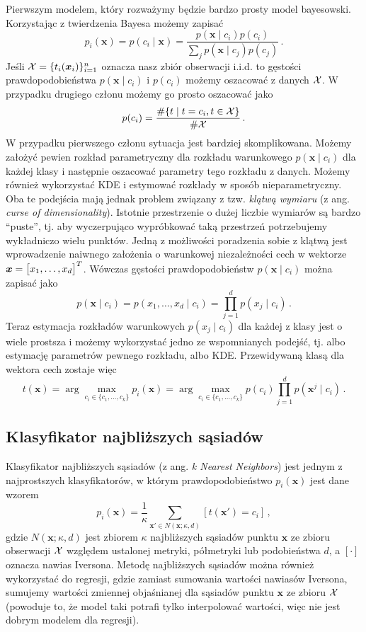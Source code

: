 \documentclass{myclass}
\numberwithin{equation}{subsection}
\begin{document}
Pierwszym modelem, który rozważymy będzie bardzo prosty model bayesowski. Korzystając z twierdzenia
Bayesa możemy zapisać
\[
p_i(\bm{x}) = p(c_i \mid \bm{x}) = \frac{ p(\bm{x} \mid c_i) p(c_i) }{ \sum_j p(\bm{x} \mid c_j) p(c_j) }\,.
\]
Jeśli \(\mathcal{X} = \{t_i(\bm{x}_i)\}_{i=1}^n\) oznacza nasz zbiór obserwacji i.i.d. to gęstości
prawdopodobieństwa \(p(\bm{x} \mid c_i)\) i \(p(c_i)\) możemy oszacować z danych \(\mathcal{X}\). W
przypadku drugiego członu możemy go prosto oszacować jako
\[
p(c_i) = \frac{\#\{t \mid t = c_i, t \in \mathcal{X}\}}{\#\mathcal{X}}\,.
\]
W przypadku pierwszego członu sytuacja jest bardziej skomplikowana. Możemy założyć pewien rozkład
parametryczny dla rozkładu warunkowego \(p(\bm{x} \mid c_i)\) dla każdej klasy i następnie oszacować
parametry tego rozkładu z danych. Możemy również wykorzystać KDE i estymować rozkłady w sposób
nieparametryczny. Oba te podejścia mają jednak problem związany z tzw. \emph{klątwą wymiaru} (z ang.
\textit{curse of dimensionality}). Istotnie przestrzenie o dużej liczbie wymiarów są bardzo
\enquote{puste}, tj. aby wyczerpująco wypróbkować taką przestrzeń potrzebujemy wykładniczo wielu
punktów. Jedną z możliwości poradzenia sobie z klątwą jest wprowadzenie naiwnego założenia o
warunkowej niezależności cech w wektorze \(\bm{x} = \mqty[x_1, \ldots, x_d]^T\). Wówczas gęstości
prawdopodobieństw \(p(\bm{x} \mid c_i)\) można zapisać jako
\[
p(\bm{x} \mid c_i) = p(x_1, \ldots, x_d \mid c_i) = \prod_{j=1}^d p(x_j \mid c_i)\,.
\]
Teraz estymacja rozkładów warunkowych \(p(x_j \mid c_i)\) dla każdej z klasy jest o wiele prostsza i
możemy wykorzystać jedno ze wspomnianych podejść, tj. albo estymację parametrów pewnego rozkładu,
albo KDE. Przewidywaną klasą dla wektora cech zostaje więc
\[
t(\bm{x}) = \arg\max_{c_i \in \{c_1,\ldots,c_k\} } p_i(\bm{x}) = \arg\max_{c_i \in \{c_1,\ldots,c_k\} } p(c_i) \prod_{j=1}^d p(\bm{x}^j \mid c_i)\,.
\]


\subsection{Klasyfikator najbliższych sąsiadów}

Klasyfikator najbliższych sąsiadów (z ang. \textit{k Nearest Neighbors}) jest jednym z najprostszych
klasyfikatorów, w którym prawdopodobieństwo \(p_i(\bm{x})\) jest dane wzorem
\[
p_i(\bm{x}) = \frac{1}{\kappa} \sum_{\bm{x}' \in N(\bm{x}; \kappa, d)} [t(\bm{x}') = c_i]\,,
\]
gdzie \(N(\bm{x}; \kappa, d)\) jest zbiorem \(\kappa\) najbliższych sąsiadów punktu \(\bm{x}\) ze
zbioru obserwacji \(\mathcal{X}\) względem ustalonej metryki, półmetryki lub podobieństwa \(d\), a
\([\cdot]\) oznacza nawias Iversona. Metodę najbliższych sąsiadów można również wykorzystać do
regresji, gdzie zamiast sumowania wartości nawiasów Iversona, sumujemy wartości zmiennej objaśnianej
dla sąsiadów punktu \(\bm{x}\) ze zbioru \(\mathcal{X}\) (powoduje to, że model taki potrafi tylko
interpolować wartości, więc nie jest dobrym modelem dla regresji).
\end{document}
